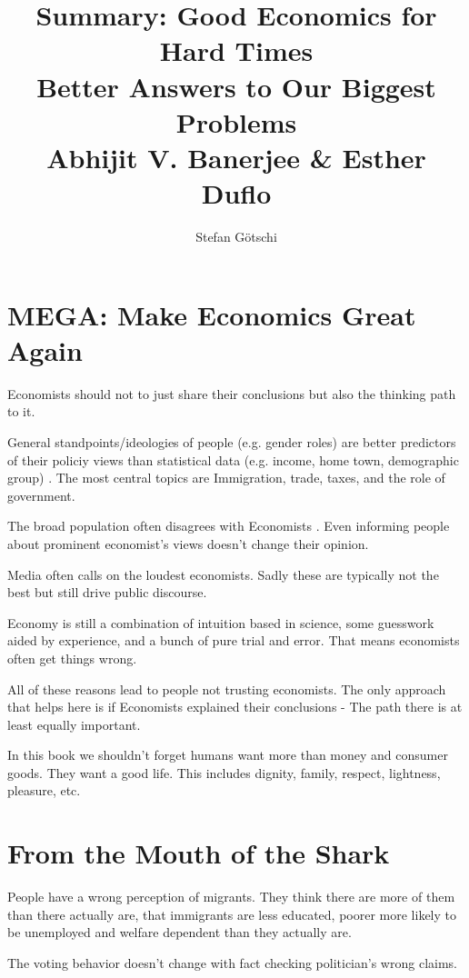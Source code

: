 \documentclass[a4paper, twocolumn]{article}
\title{Summary: Good Economics for Hard Times \\
	\large
	Better Answers to Our Biggest Problems\\
	Abhijit V. Banerjee \& Esther Duflo}
\author{Stefan Götschi}
\begin{document}
\maketitle

\section{MEGA: Make Economics Great Again}
\begin{mdframed}[style=mystyle,frametitle=Core Message]
Economists should not to just share their conclusions but also the thinking path to it.
\end{mdframed}

General standpoints/ideologies of people (e.g. gender roles) are better predictors of their policiy views than statistical data (e.g. income, home town, demographic group) \cite{hidden-tribes}. The most central topics are Immigration, trade, taxes, and the role of government.

The broad population often disagrees with Economists \cite{eco-vs-american}. Even informing people about prominent economist's views doesn't change their opinion.

Media often calls on the loudest economists. Sadly these are typically not the best but still drive public discourse.

Economy is still a combination of intuition based in science, some guesswork aided by experience, and a bunch of pure trial and error. That means economists often get things wrong.

All of these reasons lead to people not trusting economists. The only approach that helps here is if Economists explained their conclusions - The path there is at least equally important.

In this book we shouldn't forget humans want more than money and consumer goods. They want a good life. This includes dignity, family, respect, lightness, pleasure, etc.

\section{From the Mouth of the Shark}
People have a wrong perception of migrants. They think there are more of them than there actually are, that immigrants are less educated, poorer more likely to be unemployed and welfare dependent than they actually are.

The voting behavior doesn't change with fact checking politician's wrong claims.
\end{document}
